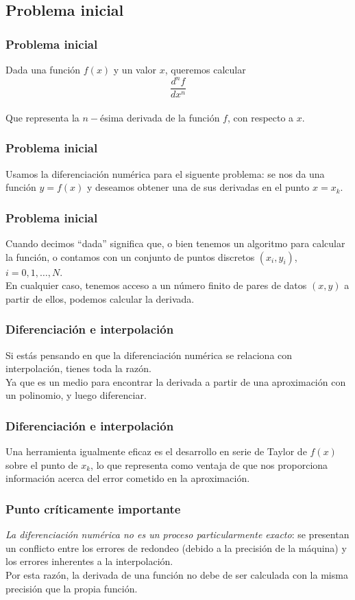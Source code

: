 \subsection{Problema inicial}
\begin{frame}
\frametitle{Problema inicial}
Dada una función $f(x)$ y un valor $x$, queremos calcular
\[\dfrac{d^{n}f}{d x^{n}} \]
\\
\bigskip
Que representa la $n-$ésima derivada de la función $f$, con respecto a $x$.
\end{frame}
\begin{frame}
\frametitle{Problema inicial}
Usamos la diferenciación numérica para el siguente problema: se nos da una función $y = f(x)$ y deseamos obtener una de sus derivadas en el punto $x = x_{k}$.
\end{frame}
\begin{frame}
\frametitle{Problema inicial}
Cuando decimos \enquote{dada} significa que, o bien tenemos un algoritmo para calcular la función, o contamos con un conjunto de puntos discretos $(x_{i}, y_{i})$, $i = 0, 1,\ldots,N$. 
\\
\bigskip
En cualquier caso, tenemos acceso a un número finito de pares de datos $(x, y)$ a partir de ellos, podemos calcular la derivada.
\end{frame}
\begin{frame}
\frametitle{Diferenciación e interpolación}
Si estás pensando en que la diferenciación numérica se relaciona con interpolación, tienes toda la razón.
\\
\bigskip
Ya que es un medio para encontrar la derivada a partir de una aproximación con un polinomio, y luego diferenciar.
\end{frame}
\begin{frame}
\frametitle{Diferenciación e interpolación}
Una herramienta igualmente eficaz es el desarrollo en serie de Taylor de $f(x)$ sobre el punto de $x_{k}$, lo que representa como ventaja de que nos proporciona información acerca del error cometido en la aproximación.
\end{frame}
\begin{frame}
\frametitle{Punto críticamente importante}
\emph{La diferenciación numérica no es un proceso particularmente exacto}: se presentan un conflicto entre los errores de redondeo (debido a la precisión de la máquina) y los errores inherentes a la interpolación.
\\
\bigskip
\pause
Por esta razón, la derivada de una función no debe de ser calculada con la misma precisión que la propia función.
\end{frame}
